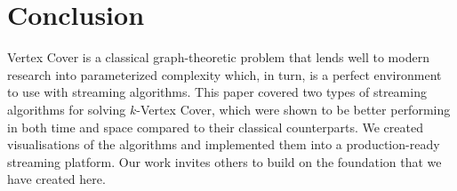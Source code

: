 \section{Conclusion}

Vertex Cover is a classical graph-theoretic problem that lends well to modern
research into parameterized complexity which, in turn, is a perfect environment
to use with streaming algorithms. This paper covered two types of streaming
algorithms for solving \(k\)-Vertex Cover, which were shown to be better
performing in both time and space compared to their classical counterparts. We
created visualisations of the algorithms and implemented them into a
production-ready streaming platform. Our work invites others to build on the
foundation that we have created here.
